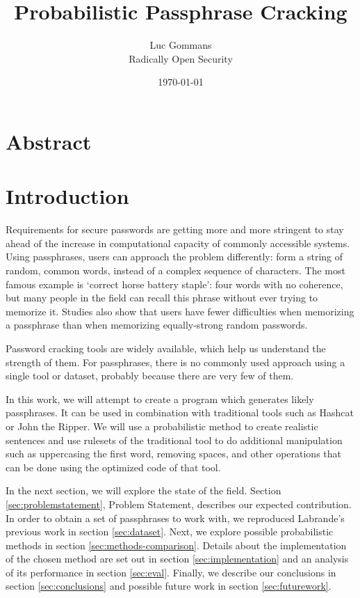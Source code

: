 \documentclass{article}
\begin{document}
\title{Probabilistic Passphrase Cracking}
\date{\today{}}
\author{Luc Gommans \\
	Radically Open Security
}

\maketitle

\section*{Abstract}



\section{Introduction}


Requirements for secure passwords are getting more and more stringent to stay
ahead of the increase in computational capacity of commonly accessible systems.
Using passphrases, users can approach the problem differently: form a string of
random, common words, instead of a complex sequence of characters. The most
famous example is `correct horse battery staple': four words with no coherence,
but many people in the field can recall this phrase without ever trying to
memorize it\cite{own}. Studies also show that users have fewer difficulties
when memorizing a passphrase than when memorizing equally-strong random
passwords\cite{behavioral-analysis}\cite{pwd-memorability}.

Password cracking tools are widely available, which help us understand the
strength of them. For passphrases, there is no commonly used approach using a
single tool or dataset, probably because there are very few of them.

In this work, we will attempt to create a program which generates likely
passphrases. It can be used in combination with traditional tools such as
Hashcat or John the Ripper. We will use a probabilistic method to create
realistic sentences and use rulesets of the traditional tool to do additional
manipulation such as uppercasing the first word, removing spaces, and other
operations that can be done using the optimized code of that tool.

In the next section, we will explore the state of the field. Section
\ref{sec:problemstatement}, Problem Statement, describes our expected
contribution. In order to obtain a set of passphrases to work with, we
reproduced Labrande's previous work in section \ref{sec:dataset}. Next, we
explore possible probabilistic methods in section \ref{sec:methods-comparison}.
Details about the implementation of the chosen method are set out in section
\ref{sec:implementation} and an analysis of its performance in section
\ref{sec:eval}. Finally, we describe our conclusions in section
\ref{sec:conclusions} and possible future work in section \ref{sec:futurework}.
\end{document}
